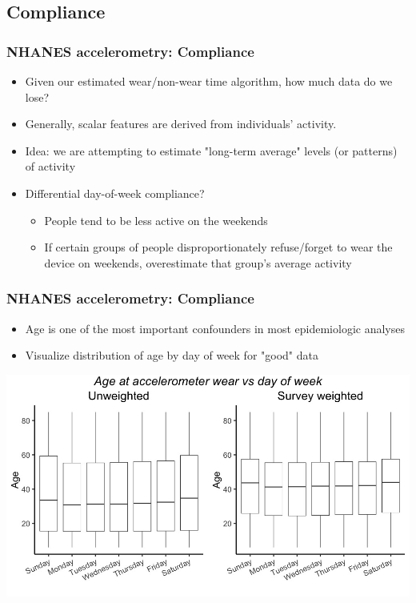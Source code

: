 \documentclass[10pt]{beamer}\usepackage[]{graphicx}\usepackage[]{color}
\begin{document}
\subsection{Compliance}

\begin{frame}
\frametitle{NHANES accelerometry: Compliance}
\begin{itemize}
\item Given our estimated wear/non-wear time algorithm, how much data do we lose?
\item Generally, scalar features are derived from individuals' activity. 
\item Idea: we are attempting to estimate "long-term average" levels (or patterns) of activity
\item Differential day-of-week compliance?
    \begin{itemize}
    \item People tend to be less active on the weekends 
    \item If certain groups of people disproportionately refuse/forget to wear the device on weekends,
            overestimate that group's average activity
    \end{itemize}
\end{itemize}
\end{frame}




\begin{frame}
\frametitle{NHANES accelerometry: Compliance}
\begin{itemize}
\item Age is one of the most important confounders in most epidemiologic analyses
\item Visualize distribution of age by day of week for "good" data
\end{itemize}
\begin{center}
\includegraphics[width=\textwidth]{wear_time_by_dow}
\end{center}
\end{frame}
\end{document}
